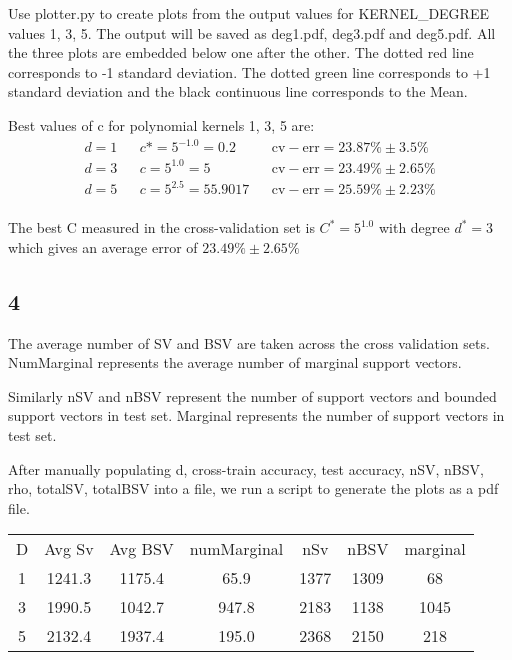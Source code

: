 \documentclass{article}
\begin{document}
Use plotter.py\cite{plotterpy} to create plots from the output values for KERNEL\_DEGREE values 1, 3, 5.  The output will be saved as deg1.pdf, deg3.pdf and deg5.pdf.  All the three plots are embedded below one after the other.  The dotted red line corresponds to -1 standard deviation.  The dotted green line corresponds to +1 standard deviation and the black continuous line corresponds to the Mean.




Best values of c for polynomial kernels 1, 3, 5 are:
\begin{align*}
  d = 1 && c* = 5^{-1.0} = 0.2 && \mathrm{cv-err} = 23.87\% \pm 3.5\% \\
  d = 3 && c = 5^{1.0} = 5 && \mathrm{cv-err} = 23.49\% \pm 2.65\%\\
  d = 5 && c = 5^{2.5} = 55.9017 && \mathrm{cv-err} = 25.59\% \pm 2.23\% \\
\end{align*}

The best C measured in the cross-validation set is \( C^{*} = 5^{1.0} \) with degree \( d^{*} = 3 \) which gives an average error of \( 23.49\% \pm 2.65\% \)

\subsection*{4}
The average number of SV and BSV are taken across the cross validation sets.  NumMarginal represents the average number of marginal support vectors.

Similarly nSV and nBSV represent the number of support vectors and bounded support vectors in test set.  Marginal represents the number of support vectors in test set.

After manually populating d, cross-train accuracy, test accuracy, nSV, nBSV, rho, totalSV, totalBSV into a file\cite{ques4file}, we run a script\cite{ques4py} to generate the plots as a pdf file.

\begin{tabular}{*{7}{c}}
  D & Avg Sv & Avg BSV & numMarginal & nSv & nBSV & marginal \\
  1 & 1241.3 & 1175.4 & 65.9 & 1377 & 1309 & 68 \\
  3 & 1990.5 & 1042.7 & 947.8 & 2183 & 1138 & 1045 \\
  5 & 2132.4 & 1937.4 & 195.0 & 2368 & 2150 & 218 \\
\end{tabular}
\end{document}
